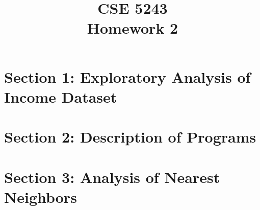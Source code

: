 \documentclass[journal,transmag]{IEEEtran}
\begin{document}
\title{CSE 5243\\Homework 2}
\author{}


\maketitle
\section{Section 1: Exploratory Analysis of Income Dataset}
	
\section{Section 2: Description of Programs}
	
\section{Section 3: Analysis of Nearest Neighbors}
	
%	
%	
%	
%	
%	
\end{document}
